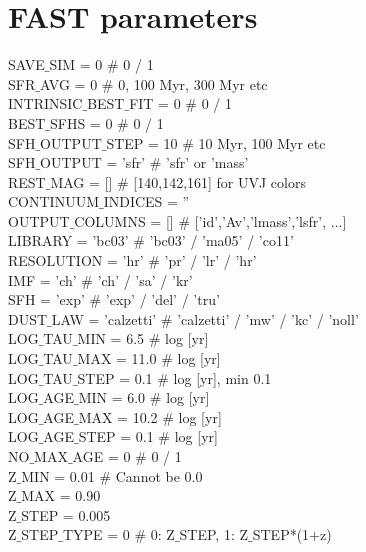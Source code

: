 \section{FAST parameters}
\label{sec:fast}
\begin{tt}SAVE$\_$SIM           = 0             $\#$ 0 / 1			\\
SFR$\_$AVG            = 0             $\#$ 0, 100 Myr, 300 Myr etc\\		
INTRINSIC$\_$BEST$\_$FIT = 0             $\#$ 0 / 1				\\
BEST$\_$SFHS          = 0             $\#$ 0 / 1\\
SFH$\_$OUTPUT$\_$STEP    = 10            $\#$ 10 Myr, 100 Myr etc\\
SFH$\_$OUTPUT         = 'sfr'         $\#$ 'sfr' or 'mass'\\
REST$\_$MAG           = []            $\#$ [140,142,161] for UVJ colors\\
CONTINUUM$\_$INDICES  = ''\\
OUTPUT$\_$COLUMNS     = []            $\#$ ['id','Av','lmass','lsfr', ...]\\
LIBRARY             = 'bc03'         $\#$ 'bc03' / 'ma05' / 'co11'\\
RESOLUTION          = 'hr'           $\#$ 'pr' / 'lr' / 'hr'\\
IMF                 = 'ch'           $\#$ 'ch' / 'sa' / 'kr'\\
SFH                 = 'exp'          $\#$ 'exp' / 'del' / 'tru'\\
DUST$\_$LAW            = 'calzetti'     $\#$ 'calzetti' / 'mw' / 'kc' / 'noll'\\
LOG$\_$TAU$\_$MIN    = 6.5            $\#$ log [yr]\\
LOG$\_$TAU$\_$MAX    = 11.0           $\#$ log [yr]\\
LOG$\_$TAU$\_$STEP   = 0.1            $\#$ log [yr], min 0.1\\
LOG$\_$AGE$\_$MIN    = 6.0            $\#$ log [yr]\\
LOG$\_$AGE$\_$MAX    = 10.2           $\#$ log [yr]\\
LOG$\_$AGE$\_$STEP   = 0.1            $\#$ log [yr]\\
NO$\_$MAX$\_$AGE     = 0              $\#$ 0 / 1\\
Z$\_$MIN          = 0.01           $\#$ Cannot be 0.0\\
Z$\_$MAX          = 0.90\\
Z$\_$STEP         = 0.005\\
Z$\_$STEP$\_$TYPE    = 0              $\#$ 0: Z$\_$STEP, 1: Z$\_$STEP*(1+z)\\

\end{tt}
